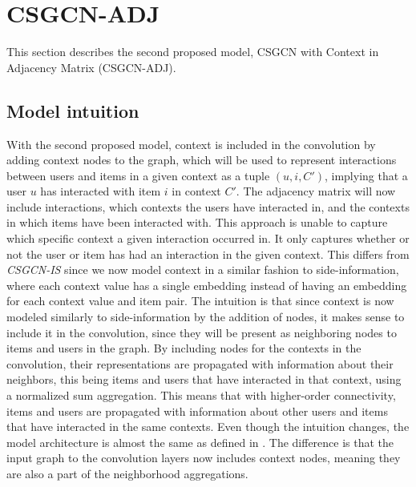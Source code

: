 \section{CSGCN-ADJ}\label{sec:csgcn_adj}
This section describes the second proposed model, CSGCN with Context in Adjacency Matrix (CSGCN-ADJ).

\subsection{Model intuition}\label{subsec:csgcn_adj_intuition}
With the second proposed model, context is included in the convolution by adding context nodes to the graph, which will be used to represent interactions between users and items in a given context as a tuple $(u,i,C')$, implying that a user $u$ has interacted with item $i$ in context $C'$.
The adjacency matrix will now include interactions, which contexts the users have interacted in, and the contexts in which items have been interacted with.
This approach is unable to capture which specific context a given interaction occurred in.
It only captures whether or not the user or item has had an interaction in the given context.
This differs from \textit{CSGCN-IS} since we now model context in a similar fashion to side-information, where each context value has a single embedding instead of having an embedding for each context value and item pair.
The intuition is that since context is now modeled similarly to side-information by the addition of nodes, it makes sense to include it in the convolution, since they will be present as neighboring nodes to items and users in the graph.
By including nodes for the contexts in the convolution, their representations are propagated with information about their neighbors, this being items and users that have interacted in that context, using a normalized sum aggregation.
This means that with higher-order connectivity, items and users are propagated with information about other users and items that have interacted in the same contexts.
Even though the intuition changes, the model architecture is almost the same as defined in .
The difference is that the input graph to the convolution layers now includes context nodes, meaning they are also a part of the neighborhood aggregations.

